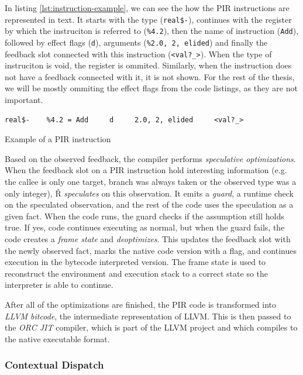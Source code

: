 In listing \ref{lst:instruction-example}, we can see the how the PIR instructions are represented in text. It starts with the type (\texttt{real\$-}), continues with the register by which the instruciton is referred to (\texttt{\%4.2}), then the name of instruction (\texttt{Add}), followed by effect flags (\texttt{d}), arguments (\texttt{\%2.0, 2, elided}) and finally the feedback slot connected with this instruction (\texttt{<val?\_>}). When the type of instruciton is void, the register is ommited. Similarly, when the instruction does not have a feedback connected with it, it is not shown. For the rest of the thesis, we will be mostly ommiting the effect flags from the code listings, as they are not important.

\begin{listing}[H]
	\begin{verbatim}
real$-    %4.2 = Add     d     2.0, 2, elided     <val?_>
  \end{verbatim}
	\caption{Example of a PIR instruction}\label{lst:instruction-example}
\end{listing}

Based on the observed feedback, the compiler performs \textit{speculative optimizations}. When the feedback slot on a PIR instruction hold interesting information (e.g. the callee is only one target, branch was always taken or the observed type was a only integer), Ř \textit{speculates} on this observation. It emits a \textit{guard}, a runtime check on the speculated observation, and the rest of the code uses the speculation as a given fact. When the code runs, the guard checks if the assumption still holds true. If yes, code continues executing as normal, but when the guard fails, the code creates a \textit{frame state} and \textit{deoptimizes}. This updates the feedback slot with the newly observed fact, marks the native code version with a flag, and continues execution in the bytecode interpreted version. The frame state is used to reconstruct the environment and execution stack to a correct state so the interpreter is able to continue. 

After all of the optimizations are finished, the PIR code is transformed into \textit{LLVM bitcode}, the intermediate representation of LLVM. This is then passed to the \textit{ORC JIT} compiler, which is part of the LLVM project and which compiles to the native executable format.

\subsubsection*{Contextual Dispatch}\label{ch:1-ctx-dispatch}

